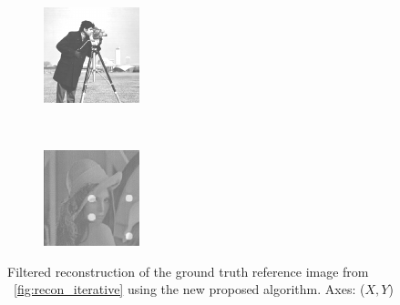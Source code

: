 \begin{figure}
  \centering
  \begin{subfigure}[t]{0.3\linewidth}
    \includegraphics[width=\textwidth]{Chapters/flopt/Figs/PDF/results/no_helix/flopt_camerman}
  \end{subfigure}~
  \begin{subfigure}[t]{0.3\linewidth}
    \includegraphics[width=\textwidth]{Chapters/flopt/Figs/PDF/results/no_helix/flopt_filter}
  \end{subfigure}
  \caption{
  Filtered reconstruction of the ground truth reference image from \figurename~\ref{fig:recon_iterative} using the new proposed algorithm.
  Axes: (\(X,Y\))
  }\label{fig:flopt_filter}
\end{figure}

